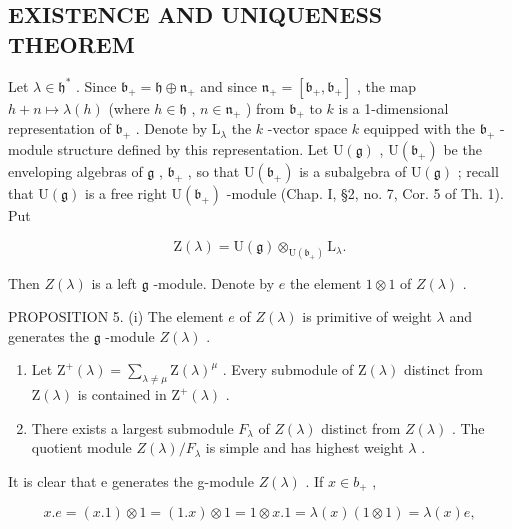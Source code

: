 \subsection{EXISTENCE AND UNIQUENESS THEOREM}

Let \(\lambda \in \mathfrak{h}^*\) . Since \(\mathfrak{b}_{+} = \mathfrak{h} \oplus \mathfrak{n}_{+}\) and since \(\mathfrak{n}_{+} = [\mathfrak{b}_{+}, \mathfrak{b}_{+}]\) , the map \(h + n \mapsto \lambda(h)\) (where \(h \in \mathfrak{h}\) , \(n \in \mathfrak{n}_{+}\) ) from \(\mathfrak{b}_{+}\) to \(k\) is a 1-dimensional representation of \(\mathfrak{b}_{+}\) . Denote by \(\mathrm{L}_{\lambda}\) the \(k\) -vector space \(k\) equipped with the \(\mathfrak{b}_{+}\) -module structure defined by this representation. Let \(\mathrm{U}(\mathfrak{g})\) , \(\mathrm{U}(\mathfrak{b}_{+})\) be the enveloping algebras of \(\mathfrak{g}\) , \(\mathfrak{b}_{+}\) , so that \(\mathrm{U}(\mathfrak{b}_{+})\) is a subalgebra of \(\mathrm{U}(\mathfrak{g})\) ; recall that \(\mathrm{U}(\mathfrak{g})\) is a free right \(\mathrm{U}(\mathfrak{b}_{+})\) -module (Chap. I, §2, no. 7, Cor. 5 of Th. 1). Put

\[
\mathrm{Z} (\lambda) = \mathrm{U} (\mathfrak {g}) \otimes_ {\mathrm{U} (\mathfrak {b} _ {+})} \mathrm{L} _ {\lambda}.\tag{2}
\]

Then \(Z(\lambda)\) is a left \(\mathfrak{g}\) -module. Denote by \(e\) the element \(1 \otimes 1\) of \(Z(\lambda)\) .

PROPOSITION 5. (i) The element \(e\) of \(Z(\lambda)\) is primitive of weight \(\lambda\) and generates the \(\mathfrak{g}\) -module \(Z(\lambda)\) .

\begin{enumerate}
\def\labelenumi{(\roman{enumi})}
\setcounter{enumi}{1}
\item
  Let \(\mathrm{Z}^{+}(\lambda) = \sum_{\lambda \neq \mu} \mathrm{Z}(\lambda)^{\mu}\) . Every submodule of \(\mathrm{Z}(\lambda)\) distinct from \(\mathrm{Z}(\lambda)\) is contained in \(\mathrm{Z}^{+}(\lambda)\) .
\item
  There exists a largest submodule \(F_{\lambda}\) of \(Z(\lambda)\) distinct from \(Z(\lambda)\) . The quotient module \(Z(\lambda)/F_{\lambda}\) is simple and has highest weight \(\lambda\) .
\end{enumerate}

It is clear that e generates the g-module \(Z(\lambda)\) . If \(x \in b_{+}\) ,

\[
x. e = (x. 1) \otimes 1 = (1. x) \otimes 1 = 1 \otimes x. 1 = \lambda (x) (1 \otimes 1) = \lambda (x) e,
\]

